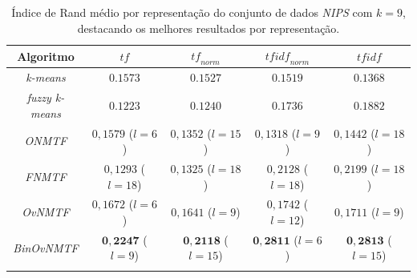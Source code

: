 \documentclass[
    12pt,                %
    oneside,            %
    a4paper,            %
    english,            %
    brazil                %
    ]{abntex2ppgsi}
\begin{document}
\begin{table}[H]
\centering
    \caption{Índice de Rand médio por representação do conjunto de dados \textit{NIPS} com $k = 9$, destacando os melhores resultados por representação.}
    \begin{tabular}{ccccc}
        \hline
        Algoritmo              & $\textit{tf}$ & $\textit{tf}_{norm}$ & $\textit{tfidf}_{norm}$ & $\textit{tfidf}$ \\
        \hline
        \textit{k-means}       & $0.1573$            & $0.1527$            & $0.1519$            & $0.1368$ \\
        \textit{fuzzy k-means} & $0.1223$            & $0.1240$            & $0.1736$            & $0.1882$ \\
        \textit{ONMTF}         & $0,1579$ ($l = 6$)  & $0,1352$ ($l = 15$) & $0,1318$ ($l = 9$)  & $0,1442$ ($l = 18$) \\
        \textit{FNMTF}         & $0,1293$ ($l = 18$) & $0,1325$ ($l = 18$) & $0,2128$ ($l = 18$) & $0,2199$ ($l = 18$) \\
        \textit{OvNMTF}        & $0,1672$ ($l = 6$)  & $0,1641$ ($l = 9$)  & $0,1742$ ($l = 12$) & $0,1711$ ($l = 9$) \\
        \textit{BinOvNMTF}     & $\mathbf{0,2247}$ ($l = 9$) & $\mathbf{0,2118}$ ($l = 15$) & $\mathbf{0,2811}$ ($l = 6$) & $\mathbf{0,2813}$ ($l = 15$) \\
        \hline \\
    \end{tabular}
    \label{tab:experiments-quant-rand:nips}
\end{table}
\end{document}
